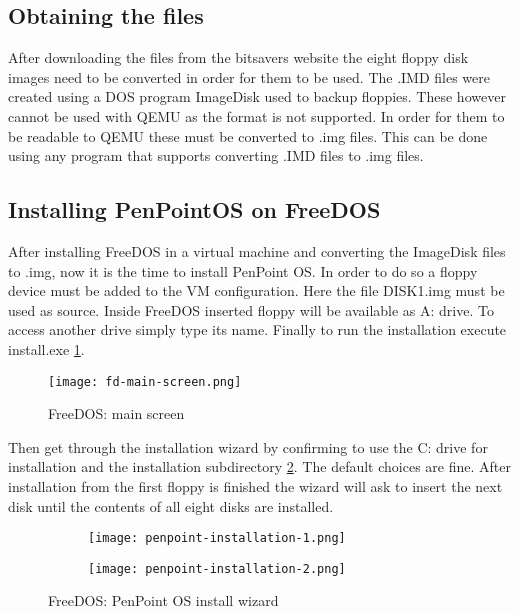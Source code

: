 \subsection{Obtaining the files}

After downloading the files from the bitsavers website the eight floppy disk
images need to be converted in order for them to be used. The .IMD files were
created using a DOS program ImageDisk used to backup floppies. These however
cannot be used with QEMU as the format is not supported. In order for them to
be readable to QEMU these must be converted to .img files. This can be done
using any program that supports converting .IMD files to .img files.

\subsection{Installing PenPointOS on FreeDOS}

After installing FreeDOS in a virtual machine and converting the ImageDisk
files to .img, now it is the time to install PenPoint OS. In order to do so
a floppy device must be added to the VM configuration. Here the file DISK1.img
must be used as source. Inside FreeDOS inserted floppy will be available as A:
drive. To access another drive simply type its name. Finally to run the
installation execute install.exe \ref{fig:fd-main-screen}.

\begin{figure}[H]
    \centering
    \texttt{[image: fd-main-screen.png]}
    \caption{FreeDOS: main screen}
    \label{fig:fd-main-screen}
\end{figure}

Then get through the installation wizard by confirming to use the C: drive for
installation and the installation subdirectory \ref{fig:penpoint-installation}.
The default choices are fine.  After installation from the first floppy is
finished the wizard will ask to insert the next disk until the contents of all
eight disks are installed.

\begin{figure}[H]
    \centering
    \begin{subfigure}[b]{0.45\linewidth}
        \texttt{[image: penpoint-installation-1.png]}
    \end{subfigure}
    \hfill
    \begin{subfigure}[b]{0.45\linewidth}
        \texttt{[image: penpoint-installation-2.png]}
    \end{subfigure}
    \caption{FreeDOS: PenPoint OS install wizard}
    \label{fig:penpoint-installation}
\end{figure}

